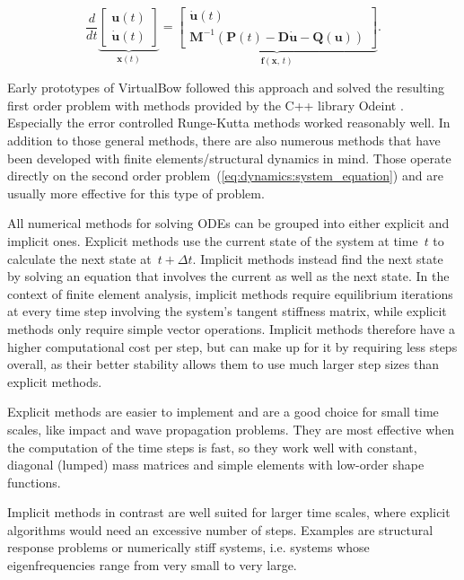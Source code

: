 \begin{equation}
\frac{d}{dt}
\underbrace{
\begin{bmatrix}
\boldsymbol{u}(t) \\
\dot{\boldsymbol{u}}(t)
\end{bmatrix}
}_{\boldsymbol{x}(t)}
=
\underbrace{
\begin{bmatrix}
\dot{\boldsymbol{u}}(t) \\
\boldsymbol{M}^{-1}\left(\boldsymbol{P}(t) - \boldsymbol{D}\dot{\boldsymbol{u}} - \boldsymbol{Q}(\boldsymbol{u})\right)
\end{bmatrix}
}_{\boldsymbol{f}(\boldsymbol{x},\,t)}.
\end{equation}

Early prototypes of VirtualBow followed this approach and solved the resulting first order problem with methods provided by the C++ library Odeint \cite{bib:ahnert2011}.
Especially the error controlled Runge-Kutta methods worked reasonably well.
In addition to those general methods, there are also numerous methods that have been developed with finite elements/structural dynamics in mind.
Those operate directly on the second order problem~(\ref{eq:dynamics:system_equation}) and are usually more effective for this type of problem.

All numerical methods for solving ODEs can be grouped into either explicit and implicit ones.
Explicit methods use the current state of the system at time~$t$ to calculate the next state at~$t + \Delta t$.
Implicit methods instead find the next state by solving an equation that involves the current as well as the next state.
In the context of finite element analysis, implicit methods require equilibrium iterations at every time step involving the system's tangent stiffness matrix, while explicit methods only require simple vector operations.
Implicit methods therefore have a higher computational cost per step, but can make up for it by requiring less steps overall, as their better stability allows them to use much larger step sizes than explicit methods.

Explicit methods are easier to implement and are a good choice for small time scales, like impact and wave propagation problems.
They are most effective when the computation of the time steps is fast, so they work well with constant, diagonal (lumped) mass matrices and simple elements with low-order shape functions.

Implicit methods in contrast are well suited for larger time scales, where explicit algorithms would need an excessive number of steps.
Examples are structural response problems or numerically stiff systems, i.e. systems whose eigenfrequencies range from very small to very large.

